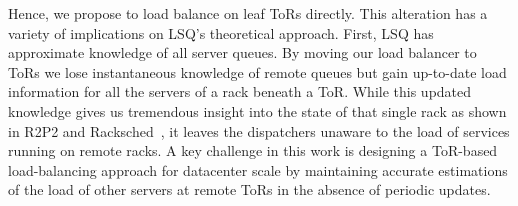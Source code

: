 Hence, we propose to load balance on leaf ToRs directly. This
alteration has a variety of implications on LSQ's theoretical
approach. First, LSQ has approximate knowledge of all server
queues. By moving our load balancer to ToRs we lose instantaneous
knowledge of remote queues but gain up-to-date load information for
all the servers of a rack beneath a ToR.  
%
While this updated knowledge gives us tremendous insight into the state of that single
rack as shown in R2P2 and Racksched~\cite{r2p2, racksched}, it leaves the
dispatchers unaware to the load of services running on remote racks.
A key challenge in this work is designing a ToR-based load-balancing
approach for datacenter scale by maintaining accurate estimations of
the load of other servers at remote ToRs in the absence of periodic updates. 




